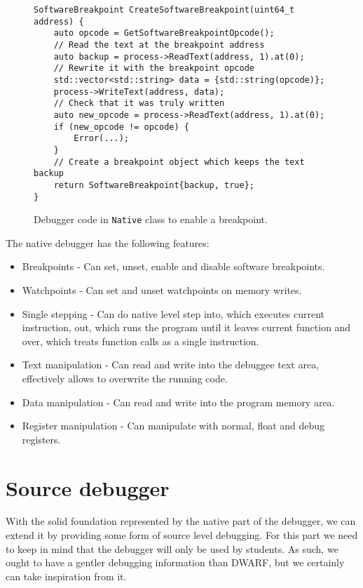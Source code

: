 \begin{figure}
    \begin{verbatim}
SoftwareBreakpoint CreateSoftwareBreakpoint(uint64_t address) {
    auto opcode = GetSoftwareBreakpointOpcode();
    // Read the text at the breakpoint address
    auto backup = process->ReadText(address, 1).at(0);
    // Rewrite it with the breakpoint opcode
    std::vector<std::string> data = {std::string(opcode)};
    process->WriteText(address, data);
    // Check that it was truly written
    auto new_opcode = process->ReadText(address, 1).at(0);
    if (new_opcode != opcode) {
        Error(...);
    }
    // Create a breakpoint object which keeps the text backup
    return SoftwareBreakpoint{backup, true};
}
    \end{verbatim}
    \caption{Debugger code in \texttt{Native} class to enable a breakpoint.}
    \label{t86dbg:breakpoint}
\end{figure}

The native debugger has the following features:
\begin{itemize}
    \item Breakpoints - Can set, unset, enable and disable software breakpoints.
    \item Watchpoints - Can set and unset watchpoints on memory writes.
    \item Single stepping - Can do native level step into, which executes
        current instruction, out, which runs the program until it leaves
        current function and over, which treats function calls as a single
        instruction.
    \item Text manipulation - Can read and write into the debuggee text area,
        effectively allows to overwrite the running code.
    \item Data manipulation - Can read and write into the program memory area.
    \item Register manipulation - Can manipulate with normal, float and debug registers.
\end{itemize}

\section{Source debugger}
With the solid foundation represented by the native part of the debugger, we
can extend it by providing some form of source level debugging. For this part
we need to keep in mind that the debugger will only be used by students.
As such, we ought to have a gentler debugging information than DWARF,
but we certainly can take inspiration from it.

